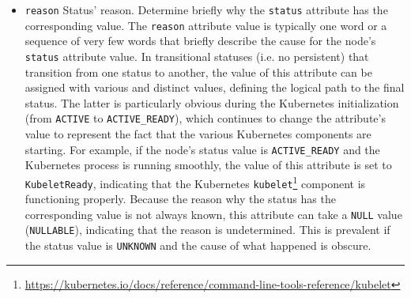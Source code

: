 \begin{itemize}
  \item \texttt{reason}
    \newline
    Status' reason.
    \newline
    Determine briefly why the \texttt{status} attribute has the corresponding value.
    The \texttt{reason} attribute value is typically one word or a sequence of very
    few words that briefly describe the cause for the node's \texttt{status}
    attribute value. In transitional statuses (i.e. no persistent) that
    transition from one status to another, the value of this attribute can be assigned
    with various and distinct values, defining the logical path to the final
    status. The latter is particularly obvious during the Kubernetes initialization
    (from \texttt{ACTIVE} to \texttt{ACTIVE\_READY}), which continues to change
    the attribute's value to represent the fact that the various Kubernetes
    components are starting.
    \newline
    For example, if the node's status value is \texttt{ACTIVE\_READY} and the Kubernetes
    process is running smoothly, the value of this attribute is set to \texttt{KubeletReady},
    indicating that the Kubernetes \texttt{kubelet}\footnote{\url{https://kubernetes.io/docs/reference/command-line-tools-reference/kubelet}}
    component is functioning properly.
    \newline
    Because the reason why the status has the corresponding value is not always
    known, this attribute can take a \texttt{NULL} value (\texttt{NULLABLE}),
    indicating that the reason is undetermined. This is prevalent if the status value
    is \texttt{UNKNOWN} and the cause of what happened is obscure.


\end{itemize}
